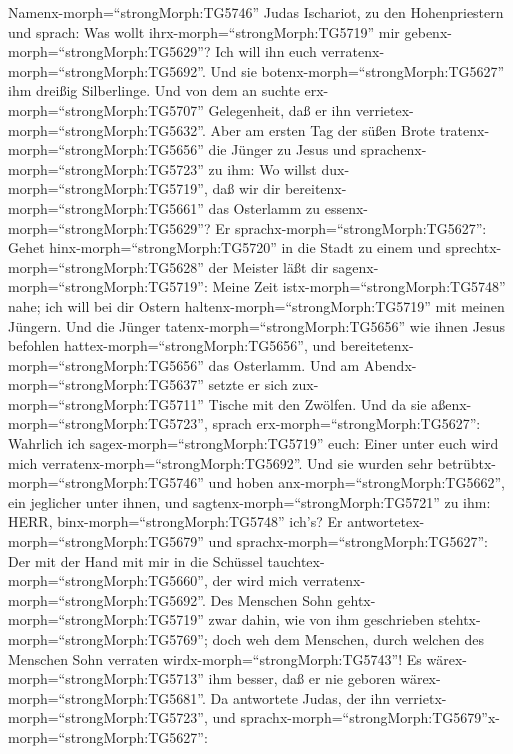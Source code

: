 Namenx-morph=``strongMorph:TG5746'' Judas Ischariot, zu den
Hohenpriestern  und sprach: Was wollt
ihrx-morph=``strongMorph:TG5719'' mir
gebenx-morph=``strongMorph:TG5629''? Ich will ihn euch
verratenx-morph=``strongMorph:TG5692''. Und sie
botenx-morph=``strongMorph:TG5627'' ihm dreißig Silberlinge.
 Und von dem an suchte erx-morph=``strongMorph:TG5707''
Gelegenheit, daß er ihn verrietex-morph=``strongMorph:TG5632''.
 Aber am ersten Tag der süßen Brote
tratenx-morph=``strongMorph:TG5656'' die Jünger zu Jesus und
sprachenx-morph=``strongMorph:TG5723'' zu ihm: Wo willst
dux-morph=``strongMorph:TG5719'', daß wir dir
bereitenx-morph=``strongMorph:TG5661'' das Osterlamm zu
essenx-morph=``strongMorph:TG5629''?  Er
sprachx-morph=``strongMorph:TG5627'': Gehet
hinx-morph=``strongMorph:TG5720'' in die Stadt zu einem und
sprechtx-morph=``strongMorph:TG5628'' der Meister läßt dir
sagenx-morph=``strongMorph:TG5719'': Meine Zeit
istx-morph=``strongMorph:TG5748'' nahe; ich will bei dir Ostern
haltenx-morph=``strongMorph:TG5719'' mit meinen Jüngern. 
Und die Jünger tatenx-morph=``strongMorph:TG5656'' wie ihnen Jesus
befohlen hattex-morph=``strongMorph:TG5656'', und
bereitetenx-morph=``strongMorph:TG5656'' das Osterlamm. 
Und am Abendx-morph=``strongMorph:TG5637'' setzte er sich
zux-morph=``strongMorph:TG5711'' Tische mit den Zwölfen. 
Und da sie aßenx-morph=``strongMorph:TG5723'', sprach
erx-morph=``strongMorph:TG5627'': Wahrlich ich
sagex-morph=``strongMorph:TG5719'' euch: Einer unter euch wird mich
verratenx-morph=``strongMorph:TG5692''.  Und sie wurden
sehr betrübtx-morph=``strongMorph:TG5746'' und hoben
anx-morph=``strongMorph:TG5662'', ein jeglicher unter ihnen, und
sagtenx-morph=``strongMorph:TG5721'' zu ihm: HERR,
binx-morph=``strongMorph:TG5748'' ich's?  Er
antwortetex-morph=``strongMorph:TG5679'' und
sprachx-morph=``strongMorph:TG5627'': Der mit der Hand mit mir in die
Schüssel tauchtex-morph=``strongMorph:TG5660'', der wird mich
verratenx-morph=``strongMorph:TG5692''.  Des Menschen Sohn
gehtx-morph=``strongMorph:TG5719'' zwar dahin, wie von ihm geschrieben
stehtx-morph=``strongMorph:TG5769''; doch weh dem Menschen, durch
welchen des Menschen Sohn verraten wirdx-morph=``strongMorph:TG5743''!
Es wärex-morph=``strongMorph:TG5713'' ihm besser, daß er nie geboren
wärex-morph=``strongMorph:TG5681''.  Da antwortete Judas,
der ihn verrietx-morph=``strongMorph:TG5723'', und
sprachx-morph=``strongMorph:TG5679''x-morph=``strongMorph:TG5627'':
